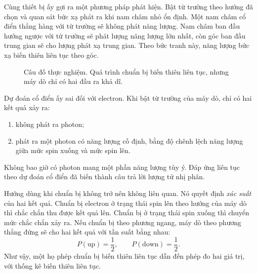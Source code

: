 Cùng thiết bị ấy gợi ra một phương pháp phát hiện. Bật từ trường theo hướng đã chọn và quan sát bức xạ phát ra khi nam châm nhỏ ổn định. Một nam châm cổ điển thẳng hàng với từ trường sẽ không phát năng lượng. Nam châm ban đầu hướng ngược với từ trường sẽ phát lượng năng lượng lớn nhất, còn góc ban đầu trung gian sẽ cho lượng phát xạ trung gian. Theo bức tranh này, năng lượng bức xạ biến thiên liên tục theo góc.

\begin{figure}[htbp]
\centering
\begin{coursefitfigure}
\end{coursefitfigure}
\caption{Câu đố thực nghiệm. Quá trình chuẩn bị biến thiên liên tục, nhưng máy dò chỉ có hai đầu ra khả dĩ.}
\end{figure}

Dự đoán cổ điển ấy sai đối với electron. Khi bật từ trường của máy dò, chỉ có hai kết quả xảy ra:
\begin{enumerate}
  \item không phát ra photon;
  \item phát ra một photon có năng lượng cố định, bằng độ chênh lệch năng lượng giữa mức spin xuống và mức spin lên.
\end{enumerate}
Không bao giờ có photon mang một phần năng lượng tùy ý. Đáp ứng liên tục theo dự đoán cổ điển đã biến thành câu trả lời lượng tử nhị phân.

Hướng dùng khi chuẩn bị không trở nên không liên quan. Nó quyết định \emph{xác suất} của hai kết quả. Chuẩn bị electron ở trạng thái spin lên theo hướng của máy dò thì chắc chắn thu được kết quả lên. Chuẩn bị ở trạng thái spin xuống thì chuyển mức chắc chắn xảy ra. Nếu chuẩn bị theo phương ngang, máy dò theo phương thẳng đứng sẽ cho hai kết quả với tần suất bằng nhau:
\begin{equation}
  P(\text{up})=\frac12,
  \qquad
  P(\text{down})=\frac12.
  \label{eq:l02-horizontal-probabilities}
\end{equation}
Như vậy, một họ phép chuẩn bị biến thiên liên tục dẫn đến phép đo hai giá trị, với thống kê biến thiên liên tục.

